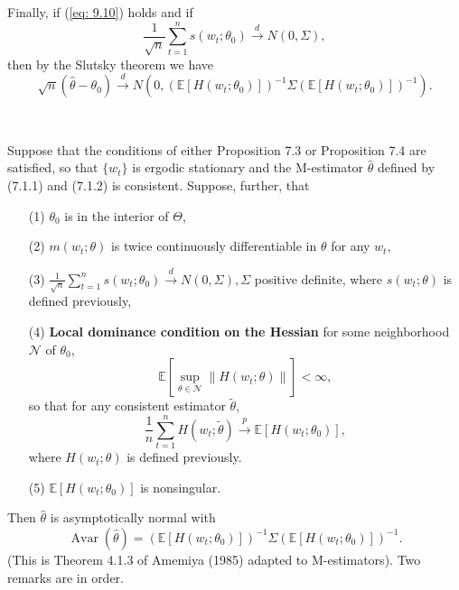 Finally, if (\ref{eq: 9.10}) holds and if 
\begin{equation}
    \frac{1}{\sqrt{n}} \sum_{t=1}^n s(w_t; \theta_0) \xrightarrow{d} N(0, \Sigma),
\end{equation}
then by the Slutsky theorem we have
\begin{equation}
    \sqrt{n}(\hat{\theta} - \theta_0) \xrightarrow{d} N \left(0, \left(\mathbb{E}[H(w_t; \theta_0)]\right)^{-1} \Sigma \left(\mathbb{E}[H(w_t; \theta_0)]\right)^{-1} \right).
\end{equation}

\begin{proposition}\label{Prop: Asy-nor-M-est}
    \

    Suppose that the conditions of either Proposition 7.3 or Proposition 7.4 are satisfied, so that $\{w_t\}$ is ergodic stationary and the M-estimator $\hat{\theta}$ defined by (7.1.1) and (7.1.2) is consistent. Suppose, further, that
    \begin{itemize}
        \item[(1)] $\theta_0$ is in the interior of $\Theta$,
        \item[(2)] $m(w_t; \theta)$ is twice continuously differentiable in $\theta$ for any $w_t$,
        \item[(3)] $\frac{1}{\sqrt{n}} \sum_{t=1}^n s(w_t; \theta_0) \xrightarrow{d} N(0, \Sigma), \Sigma$ positive definite, 
        where $s(w_t; \theta)$ is defined previously,
        \item[(4)] \textbf{Local dominance condition on the Hessian} for some neighborhood $\mathcal{N}$ of $\theta_0$,
        \[
        \mathbb{E} \left[ \sup_{\theta \in \mathcal{N}} \| H(w_t; \theta) \| \right] < \infty,
        \]
        so that for any consistent estimator $\tilde{\theta}$,
        \[
        \frac{1}{n} \sum_{t=1}^n H(w_t; \tilde{\theta}) \xrightarrow{p} \mathbb{E}[H(w_t; \theta_0)],
        \]
        where $H(w_t; \theta)$ is defined previously.
        \item[(5)] $\mathbb{E}[H(w_t; \theta_0)]$ is nonsingular.
    \end{itemize}
    Then $\hat{\theta}$ is asymptotically normal with
    \[
    \operatorname{Avar}(\hat{\theta}) = \left( \mathbb{E}[H(w_t; \theta_0)] \right)^{-1} \Sigma \left( \mathbb{E}[H(w_t; \theta_0)] \right)^{-1}.
    \]
    (This is Theorem 4.1.3 of Amemiya (1985)\cite{amemiya1985advanced} adapted to M-estimators). Two remarks are in order.
\end{proposition}

